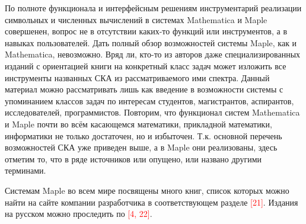 По полноте функционала и интерфейсным решениям инструментарий реализации символьных и численных вычислений в системах Mathematica и Maple совершенен, вопрос не в отсутствии каких-то функций или инструментов, а в навыках пользователей.
Дать полный обзор возможностей системы Maple, как и Mathematica, невозможно. Вряд ли, кто-то из авторов даже специализированных изданий с ориентацией книги на конкретный класс задач может изложить все инструменты названных СКА из рассматриваемого ими спектра. Данный материал можно рассматривать лишь как введение в возможности системы с упоминанием классов задач по интересам студентов, магистрантов, аспирантов, исследователей, программистов. Повторим, что функционал систем Mathematica и Maple почти во всём касающемся математики, прикладной математики, информатики не только достаточен, но и избыточен. Т.к. основной перечень возможностей СКА уже приведен выше, а в Maple они реализованы, здесь отметим то, что в ряде источников или опущено, или названо другими терминами.

Системам Maple во всем мире посвящены много книг, список которых можно найти на сайте компании разработчика в соответствующем разделе \textcolor{red}{[21]}. 
Издания на русском можно проследить по \textcolor{red}{[4, 22]}. 

